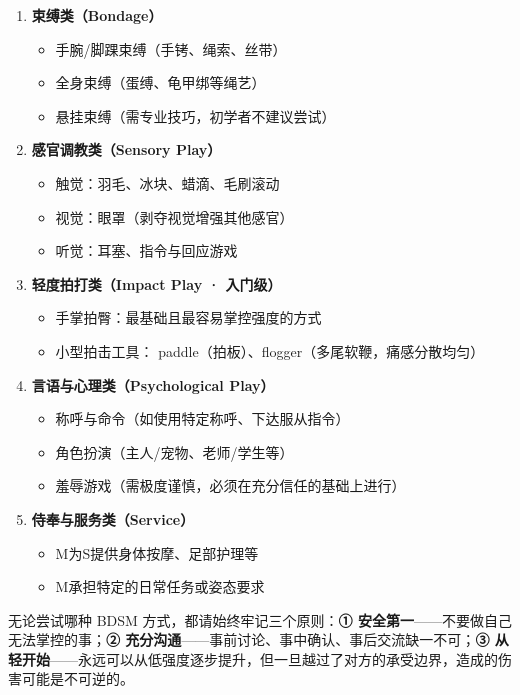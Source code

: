\documentclass[12pt,UTF8]{ctexbook}
\begin{document}
\begin{enumerate}
	\item \textbf{束缚类（Bondage）}
	\begin{itemize}
		\item 手腕/脚踝束缚（手铐、绳索、丝带）
		\item 全身束缚（蛋缚、龟甲绑等绳艺）
		\item 悬挂束缚（需专业技巧，初学者不建议尝试）
	\end{itemize}

	\item \textbf{感官调教类（Sensory Play）}
	\begin{itemize}
		\item 触觉：羽毛、冰块、蜡滴、毛刷滚动
		\item 视觉：眼罩（剥夺视觉增强其他感官）
		\item 听觉：耳塞、指令与回应游戏
	\end{itemize}

	\item \textbf{轻度拍打类（Impact Play · 入门级）}
	\begin{itemize}
		\item 手掌拍臀：最基础且最容易掌控强度的方式
		\item 小型拍击工具： paddle（拍板）、flogger（多尾软鞭，痛感分散均匀）
	\end{itemize}

	\item \textbf{言语与心理类（Psychological Play）}
	\begin{itemize}
		\item 称呼与命令（如使用特定称呼、下达服从指令）
		\item 角色扮演（主人/宠物、老师/学生等）
		\item 羞辱游戏（需极度谨慎，必须在充分信任的基础上进行）
	\end{itemize}

	\item \textbf{侍奉与服务类（Service）}
	\begin{itemize}
		\item M为S提供身体按摩、足部护理等
		\item M承担特定的日常任务或姿态要求
	\end{itemize}
\end{enumerate}

\begin{tcolorbox}[colback=pink!5!white,colframe=red!50!black,title=贴心小叮咛]
无论尝试哪种 BDSM 方式，都请始终牢记三个原则：\textbf{① 安全第一}——不要做自己无法掌控的事；\textbf{② 充分沟通}——事前讨论、事中确认、事后交流缺一不可；\textbf{③ 从轻开始}——永远可以从低强度逐步提升，但一旦越过了对方的承受边界，造成的伤害可能是不可逆的。
\end{tcolorbox}
\end{document}
